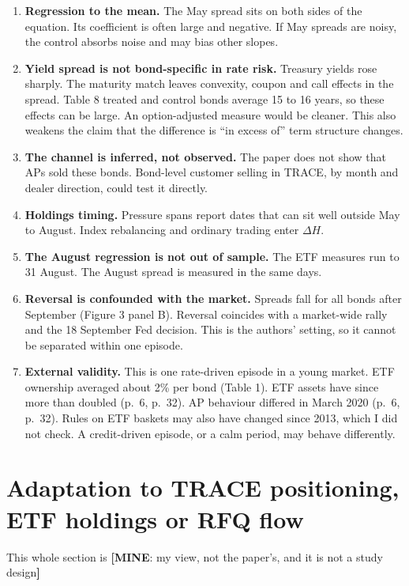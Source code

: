 \documentclass[10pt,a4paper]{article}
\newcommand{\MY}[1]{\textcolor{cmy}{\textbf{[MINE}: #1\textbf{]}}}
\begin{document}
\begin{enumerate}
\item \textbf{Regression to the mean.} The May spread sits on both sides of the equation. Its coefficient is often large and negative. If May spreads are noisy, the control absorbs noise and may bias other slopes.
\item \textbf{Yield spread is not bond-specific in rate risk.} Treasury yields rose sharply. The maturity match leaves convexity, coupon and call effects in the spread. Table 8 treated and control bonds average 15 to 16 years, so these effects can be large. An option-adjusted measure would be cleaner. This also weakens the claim that the difference is ``in excess of'' term structure changes.
\item \textbf{The channel is inferred, not observed.} The paper does not show that APs sold these bonds. Bond-level customer selling in TRACE, by month and dealer direction, could test it directly.
\item \textbf{Holdings timing.} Pressure spans report dates that can sit well outside May to August. Index rebalancing and ordinary trading enter $\Delta H$.
\item \textbf{The August regression is not out of sample.} The ETF measures run to 31 August. The August spread is measured in the same days.
\item \textbf{Reversal is confounded with the market.} Spreads fall for all bonds after September (Figure 3 panel B). Reversal coincides with a market-wide rally and the 18 September Fed decision. This is the authors' setting, so it cannot be separated within one episode.
\item \textbf{External validity.} This is one rate-driven episode in a young market. ETF ownership averaged about 2\% per bond (Table 1). ETF assets have since more than doubled (p.~6, p.~32). AP behaviour differed in March 2020 (p.~6, p.~32). Rules on ETF baskets may also have changed since 2013, which I did not check. A credit-driven episode, or a calm period, may behave differently.
\end{enumerate}

\section{Adaptation to TRACE positioning, ETF holdings or RFQ flow}\label{sec:adapt}

This whole section is \MY{my view, not the paper's, and it is not a study design}
\end{document}
